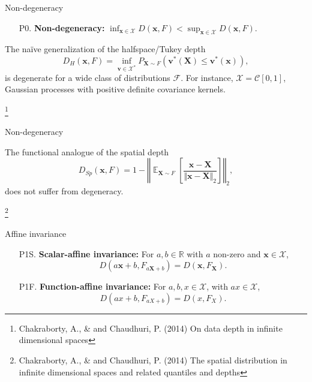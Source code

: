 \documentclass[handout, notes]{beamer}
\newcommand{\R}{\mathbb{R}}
\newcommand{\vx}{\bm{x}}
\newcommand{\vX}{\bm{X}}
\newcommand{\vv}{\bm{v}}
\DeclareMathOperator{\E}{\mathbb{E}}
\newcommand{\norm}[1]{\Vert #1 \Vert}
\newcommand\blfootnote[1]{%
  \begingroup
  \renewcommand\thefootnote{}\footnote{#1}%
  \addtocounter{footnote}{-1}%
  \endgroup
}
\begin{document}
    \begin{frame}{Non-degeneracy}
        \begin{enumerate}
            \item[P0.] \textbf{Non-degeneracy:} $\inf_{\vx \in \mathscr{X}} D(\vx, F) < \sup_{\vx \in \mathscr{X}} D(\vx, F)$.
        \end{enumerate}

        The na\"ive generalization of the halfspace/Tukey depth \[
            D_H(\vx, F) = \inf_{\vv \in \mathscr{X}^*} P_{\vX \sim F}(\vv^*(\vX) \leq \vv^*(\vx)),
        \] is degenerate for a wide class of distributions $\mathscr{F}$.
        For instance, $\mathscr{X} = \mathcal{C}[0, 1]$, Gaussian processes with
        positive definite covariance kernels.

        \blfootnote{
            Chakraborty, A., \& and Chaudhuri, P. (2014) On data depth in
            infinite dimensional spaces
        }
    \end{frame}


    \begin{frame}{Non-degeneracy}

        The functional analogue of the spatial depth \[
            D_{Sp}(\vx, F) = 1 - \left\Vert\E_{\vX \sim F}\left[\frac{\vx - \vX}{\norm{\vx - \vX}_2}\right]\right\Vert_2,
        \] does not suffer from degeneracy.


        \blfootnote{
            Chakraborty, A., \& and Chaudhuri, P. (2014) The spatial
            distribution in infinite dimensional spaces and related quantiles
            and depths
        }
    \end{frame}


    \begin{frame}{Affine invariance}
        \begin{enumerate}
            \item[P1S.] \textbf{Scalar-affine invariance:} For $a, b \in \R$
            with $a$ non-zero and $\vx \in \mathscr{X}$, \[
                D(a\vx + b, F_{a\vX + b}) = D(\vx, F_{\vX}).
            \]
            \item[P1F.] \textbf{Function-affine invariance:} For $a, b, x \in
            \mathscr{X}$, with $ax \in \mathscr{X}$, \[
                D(ax + b, F_{aX + b}) = D(x, F_{X}).
            \]
        \end{enumerate}
    \end{frame}
\end{document}
